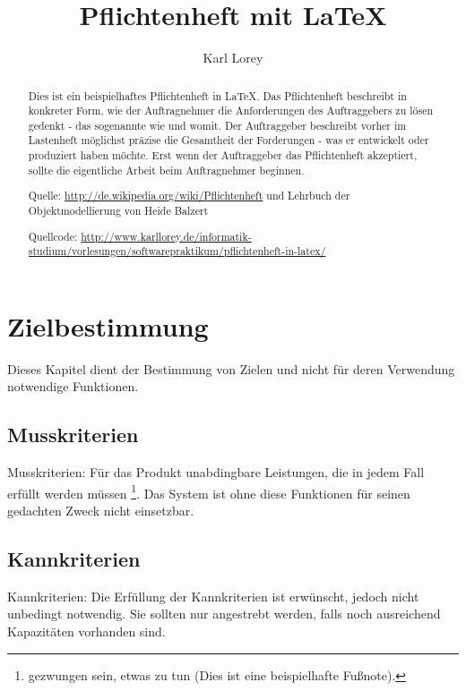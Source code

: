\documentclass[a4paper]{scrreprt}
\begin{document}
 
\title{Pflichtenheft mit LaTeX}
\author{Karl Lorey}
\maketitle
 
\begin{abstract}
Dies ist ein beispielhaftes Pflichtenheft in \LaTeX. Das Pflichtenheft
beschreibt in konkreter Form, wie der Auftragnehmer die Anforderungen des
Auftraggebers zu lösen gedenkt - das sogenannte wie und womit. Der Auftraggeber
beschreibt vorher im Lastenheft möglichst präzise die Gesamtheit der
Forderungen - was er entwickelt oder produziert haben möchte. Erst wenn der
Auftraggeber das Pflichtenheft akzeptiert, sollte die eigentliche Arbeit beim
Auftragnehmer beginnen.
\vspace{1cm}
 
Quelle: \url{http://de.wikipedia.org/wiki/Pflichtenheft} und Lehrbuch der
Objektmodellierung von Heide Balzert
\vspace{0.5cm}
 
Quellcode: \url{http://www.karllorey.de/informatik-studium/vorlesungen/softwarepraktikum/pflichtenheft-in-latex/}
\end{abstract}
 
\tableofcontents
 
\chapter{Zielbestimmung}
Dieses Kapitel dient der Bestimmung von Zielen und nicht für deren Verwendung
notwendige Funktionen.
 
\section{Musskriterien}
Musskriterien: Für das Produkt unabdingbare Leistungen, die in jedem Fall
erfüllt werden müssen \footnote{gezwungen sein, etwas zu tun (Dies ist eine
beispielhafte Fußnote).}. Das System ist ohne diese Funktionen für seinen
gedachten Zweck nicht einsetzbar.
 
\section{Kannkriterien}
Kannkriterien: Die Erfüllung der Kannkriterien ist erwünscht, jedoch nicht
unbedingt notwendig. Sie sollten nur angestrebt werden, falls noch ausreichend
Kapazitäten vorhanden sind.
 
\end{document}
